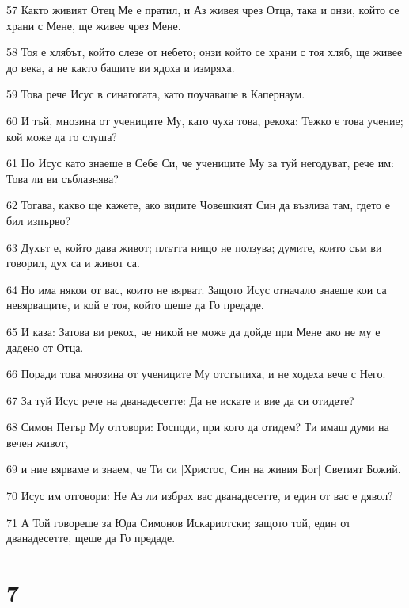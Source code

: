 \par 57 Както живият Отец Ме е пратил, и Аз живея чрез Отца, така и онзи, който се храни с Мене, ще живее чрез Мене.
\par 58 Тоя е хлябът, който слезе от небето; онзи който се храни с тоя хляб, ще живее до века, а не както бащите ви ядоха и измряха.
\par 59 Това рече Исус в синагогата, като поучаваше в Капернаум.
\par 60 И тъй, мнозина от учениците Му, като чуха това, рекоха: Тежко е това учение; кой може да го слуша?
\par 61 Но Исус като знаеше в Себе Си, че учениците Му за туй негодуват, рече им: Това ли ви съблазнява?
\par 62 Тогава, какво ще кажете, ако видите Човешкият Син да възлиза там, гдето е бил изпърво?
\par 63 Духът е, който дава живот; плътта нищо не ползува; думите, които съм ви говорил, дух са и живот са.
\par 64 Но има някои от вас, които не вярват. Защото Исус отначало знаеше кои са невярващите, и кой е тоя, който щеше да Го предаде.
\par 65 И каза: Затова ви рекох, че никой не може да дойде при Мене ако не му е дадено от Отца.
\par 66 Поради това мнозина от учениците Му отстъпиха, и не ходеха вече с Него.
\par 67 За туй Исус рече на дванадесетте: Да не искате и вие да си отидете?
\par 68 Симон Петър Му отговори: Господи, при кого да отидем? Ти имаш думи на вечен живот,
\par 69 и ние вярваме и знаем, че Ти си [Христос, Син на живия Бог] Светият Божий.
\par 70 Исус им отговори: Не Аз ли избрах вас дванадесетте, и един от вас е дявол?
\par 71 А Той говореше за Юда Симонов Искариотски; защото той, един от дванадесетте, щеше да Го предаде.

\chapter{7}


